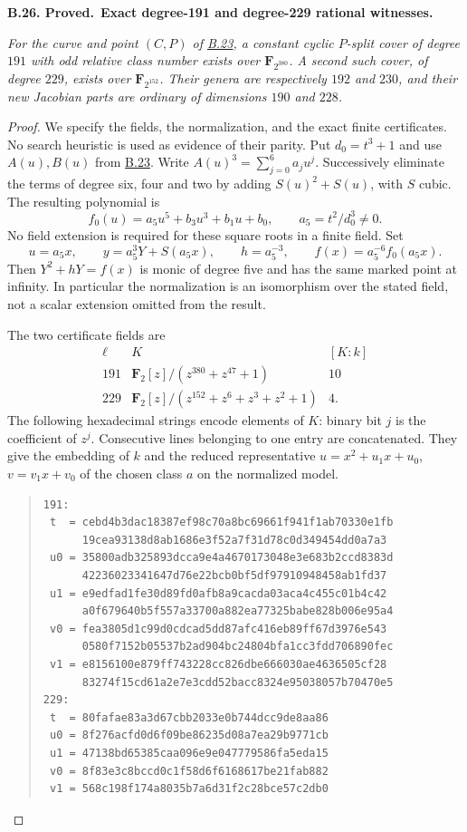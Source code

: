 \documentclass[11pt,a4paper]{article}
\newenvironment{claim}[3]{\par\medskip\noindent\hypertarget{#1}{\textbf{#1. #2.}}\ \textbf{#3.}\par\nopagebreak\smallskip\begingroup\itshape}{\endgroup\par\smallskip}
\newcommand{\statementref}[1]{\hyperlink{#1}{#1}}
\begin{document}
\begin{claim}{B.26}{Proved}{Exact degree-191 and degree-229 rational witnesses}
For the curve and point $(C,P)$ of \statementref{B.23}, a constant
cyclic $P$-split cover of degree $191$ with odd relative class
number exists over $\mathbf F_{2^{380}}$. A second such cover,
of degree $229$, exists over $\mathbf F_{2^{152}}$.
Their genera are respectively $192$ and $230$, and their new
Jacobian parts are ordinary of dimensions $190$ and $228$.
\end{claim}
\begin{proof}
We specify the fields, the normalization, and the exact finite
certificates. No search heuristic is used as evidence of their parity.
Put $d_0=t^3+1$ and use $A(u),B(u)$ from \statementref{B.23}.
Write $A(u)^3=\sum_{j=0}^6 a_j u^j$. Successively eliminate the
terms of degree six, four and two by adding $S(u)^2+S(u)$, with
$S$ cubic. The resulting polynomial is
\[
 f_0(u)=a_5u^5+b_3u^3+b_1u+b_0,
 \qquad a_5=t^2/d_0^3\ne0.
\]
No field extension is required for these square roots in a finite
field. Set
\[
 u=a_5x,\qquad y=a_5^3Y+S(a_5x),\qquad
 h=a_5^{-3},\qquad f(x)=a_5^{-6}f_0(a_5x).
\]
Then $Y^2+hY=f(x)$ is monic of degree five and has the same marked
point at infinity. In particular the normalization is an isomorphism
over the stated field, not a scalar extension omitted from the result.

The two certificate fields are
\[
 \begin{array}{c|c|c}
 \ell&K&[K:k]\\ \hline
 191&\mathbf F_2[z]/(z^{380}+z^{47}+1)&10\\
 229&\mathbf F_2[z]/(z^{152}+z^6+z^3+z^2+1)&4.
 \end{array}
\]
The following hexadecimal strings encode elements of $K$: binary
bit $j$ is the coefficient of $z^j$. Consecutive lines belonging
to one entry are concatenated. They give the embedding of $k$ and
the reduced representative $u=x^2+u_1x+u_0$, $v=v_1x+v_0$ of the
chosen class $a$ on the normalized model.
\begin{quote}\small
\begin{verbatim}
191:
 t  = cebd4b3dac18387ef98c70a8bc69661f941f1ab70330e1fb
      19cea93138d8ab1686e3f52a7f31d78c0d349454dd0a7a3
 u0 = 35800adb325893dcca9e4a4670173048e3e683b2ccd8383d
      42236023341647d76e22bcb0bf5df97910948458ab1fd37
 u1 = e9edfad1fe30d89fd0afb8a9cacda03aca4c455c01b4c42
      a0f679640b5f557a33700a882ea77325babe828b006e95a4
 v0 = fea3805d1c99d0cdcad5dd87afc416eb89ff67d3976e543
      0580f7152b05537b2ad904bc24804bfa1cc3fdd706890fec
 v1 = e8156100e879ff743228cc826dbe666030ae4636505cf28
      83274f15cd61a2e7e3cdd52bacc8324e95038057b70470e5
229:
 t  = 80fafae83a3d67cbb2033e0b744dcc9de8aa86
 u0 = 8f276acfd0d6f09be86235d08a7ea29b9771cb
 u1 = 47138bd65385caa096e9e047779586fa5eda15
 v0 = 8f83e3c8bccd0c1f58d6f6168617be21fab882
 v1 = 568c198f174a8035b7a6d31f2c28bce57c2db0
\end{verbatim}
\end{quote}


\end{proof}
\end{document}
